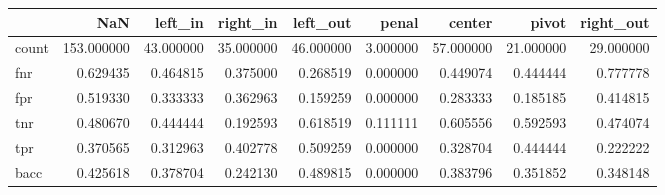 \begin{tabular}{lrrrrrrrr}
\toprule
{} &         NaN &    left\_in &   right\_in &   left\_out &     penal &     center &      pivot &  right\_out \\
\midrule
count &  153.000000 &  43.000000 &  35.000000 &  46.000000 &  3.000000 &  57.000000 &  21.000000 &  29.000000 \\
fnr   &    0.629435 &   0.464815 &   0.375000 &   0.268519 &  0.000000 &   0.449074 &   0.444444 &   0.777778 \\
fpr   &    0.519330 &   0.333333 &   0.362963 &   0.159259 &  0.000000 &   0.283333 &   0.185185 &   0.414815 \\
tnr   &    0.480670 &   0.444444 &   0.192593 &   0.618519 &  0.111111 &   0.605556 &   0.592593 &   0.474074 \\
tpr   &    0.370565 &   0.312963 &   0.402778 &   0.509259 &  0.000000 &   0.328704 &   0.444444 &   0.222222 \\
bacc  &    0.425618 &   0.378704 &   0.242130 &   0.489815 &  0.000000 &   0.383796 &   0.351852 &   0.348148 \\
\bottomrule
\end{tabular}
